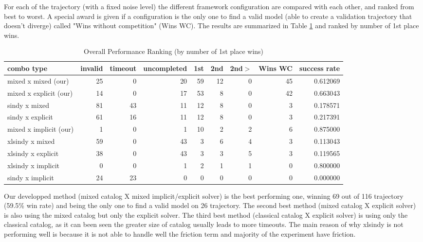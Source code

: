 \documentclass[12pt]{article}
\begin{document}
For each of the trajectory (with a fixed noise level) the different framework configuration are compared with each other, and ranked from best to worst. A special award is given if a configuration is the only one to find a valid model (able to create a validation trajectory that doesn't diverge) called "Wins without competition" (Wins WC). The results are summarized in Table \ref{tab:results_summary} and ranked by number of 1st place wins.

\begin{table}[h]
\centering
\caption{Overall Performance Ranking (by number of 1st place wins)}
\label{tab:results_summary}
\small
\begin{tabular}{lrrrrrrrr}
\hline
combo type & invalid & timeout & uncompleted & 1st & 2nd & 2nd$>$ & Wins WC & success rate \\
\hline
mixed x mixed (our) & 25 & 0 & 20 & 59 & 12 & 0 & 45 & 0.612069 \\
mixed x explicit (our) & 14 & 0 & 17 & 53 & 8 & 0 & 42 & 0.663043 \\
sindy x mixed & 81 & 43 & 11 & 12 & 8 & 0 & 3 & 0.178571 \\
sindy x explicit & 61 & 16 & 11 & 12 & 8 & 0 & 3 & 0.217391 \\
mixed x implicit (our)& 1 & 0 & 1 & 10 & 2 & 2 & 6 & 0.875000 \\
xlsindy x mixed & 59 & 0 & 43 & 3 & 6 & 4 & 3 & 0.113043 \\
xlsindy x explicit & 38 & 0 & 43 & 3 & 3 & 5 & 3 & 0.119565 \\
xlsindy x implicit & 0 & 0 & 1 & 2 & 1 & 1 & 0 & 0.800000 \\
sindy x implicit & 24 & 23 & 0 & 0 & 0 & 0 & 0 & 0.000000 \\
\hline
\end{tabular}
\end{table}



Our developped method (mixed catalog X mixed implicit/explicit solver) is the best performing one, winning 69 out of 116 trajectory (59.5\% win rate) and being the only one to find a valid model on 26 trajectory. The second best method (mixed catalog X explicit solver) is also using the mixed catalog but only the explicit solver. The third best method (classical catalog X explicit solver) is using only the classical catalog, as it can been seen the greater size of catalog usually leads to more timeouts. 
The main reason of why xlsindy is not performing well is because it is not able to handle well the friction term and majority of the experiment have friction.
\end{document}
